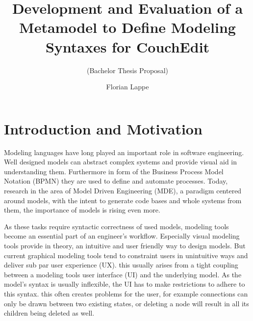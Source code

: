 \documentclass[10pt,a4paper,oneside]{scrartcl}
\title{Development and Evaluation of a Metamodel to Define Modeling Syntaxes for CouchEdit}
\subtitle{(Bachelor Thesis Proposal)}
\author{Florian Lappe}
\newcommand\hint[2]{
\ifthenelse{\boolean{showhints}}{
\begin{center}
\colorbox{black!10}{
\begin{minipage}{.963\textwidth}
#2\hfill\textbf{#1}
\end{minipage}
}\end{center}}{}
}
\begin{document}
\maketitle

\section{Introduction and Motivation}
\label{sec:motivation}


Modeling languages have long played an important role in software engineering. Well designed models can abstract complex systems and provide visual aid in understanding them. Furthermore in form of the Business Process Model Notation (BPMN) they are used to define and automate processes. Today, research in the area of Model Driven Engineering (MDE), a paradigm centered around models, with the intent to generate code bases and whole systems from them, the importance of models is rising even more.

As these tasks require syntactic correctness of used models, modeling tools become an essential part of an engineer's workflow. Especially visual modeling tools provide in theory, an intuitive and user friendly way to design models. But current graphical modeling tools tend to constraint users in unintuitive ways and deliver sub par user experience (UX). this usually arises from a tight coupling between a modeling tools user interface (UI) and the underlying model. As the model's syntax is usually inflexible, the UI has to make restrictions to adhere to this syntax. this often creates problems for the user, for example connections can only be drawn between two existing states, or deleting a node will result in all its children being deleted as well.
\end{document}
